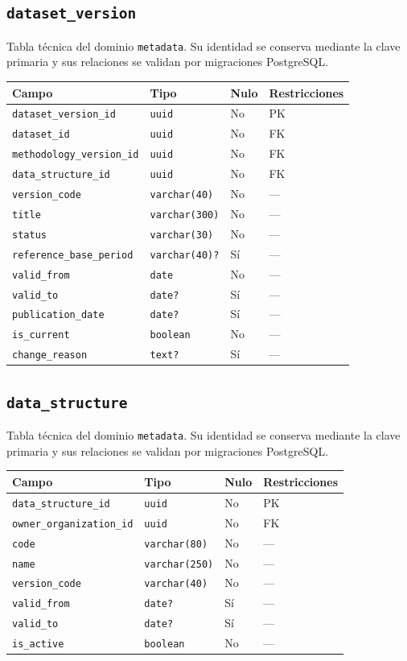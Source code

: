 \documentclass[11pt]{article}
\begin{document}
\subsection{\texttt{dataset\_version}}
Tabla técnica del dominio \texttt{metadata}. Su identidad se conserva mediante la clave primaria y sus relaciones se validan por migraciones PostgreSQL.
\begin{longtable}{>{\raggedright\arraybackslash}p{} p{} p{} p{}}
\toprule Campo & Tipo & Nulo & Restricciones \\ \midrule\endhead
\texttt{dataset\_version\_id} & \texttt{uuid} & No & PK \\
\texttt{dataset\_id} & \texttt{uuid} & No & FK \\
\texttt{methodology\_version\_id} & \texttt{uuid} & No & FK \\
\texttt{data\_structure\_id} & \texttt{uuid} & No & FK \\
\texttt{version\_code} & \texttt{varchar(40)} & No & --- \\
\texttt{title} & \texttt{varchar(300)} & No & --- \\
\texttt{status} & \texttt{varchar(30)} & No & --- \\
\texttt{reference\_base\_period} & \texttt{varchar(40)?} & Sí & --- \\
\texttt{valid\_from} & \texttt{date} & No & --- \\
\texttt{valid\_to} & \texttt{date?} & Sí & --- \\
\texttt{publication\_date} & \texttt{date?} & Sí & --- \\
\texttt{is\_current} & \texttt{boolean} & No & --- \\
\texttt{change\_reason} & \texttt{text?} & Sí & --- \\
\bottomrule\end{longtable}
\subsection{\texttt{data\_structure}}
Tabla técnica del dominio \texttt{metadata}. Su identidad se conserva mediante la clave primaria y sus relaciones se validan por migraciones PostgreSQL.
\begin{longtable}{>{\raggedright\arraybackslash}p{} p{} p{} p{}}
\toprule Campo & Tipo & Nulo & Restricciones \\ \midrule\endhead
\texttt{data\_structure\_id} & \texttt{uuid} & No & PK \\
\texttt{owner\_organization\_id} & \texttt{uuid} & No & FK \\
\texttt{code} & \texttt{varchar(80)} & No & --- \\
\texttt{name} & \texttt{varchar(250)} & No & --- \\
\texttt{version\_code} & \texttt{varchar(40)} & No & --- \\
\texttt{valid\_from} & \texttt{date?} & Sí & --- \\
\texttt{valid\_to} & \texttt{date?} & Sí & --- \\
\texttt{is\_active} & \texttt{boolean} & No & --- \\
\bottomrule\end{longtable}
\end{document}
